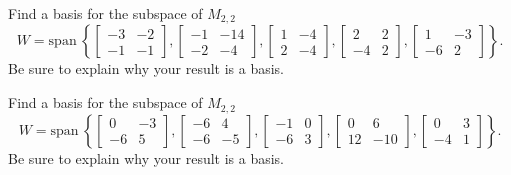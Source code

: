 \documentclass{article}
\begin{document}
\begin{exerciseStatement}
    Find a basis for the subspace of \(M_{2,2}\)
\[W=\mathrm{span}\ \left\{\left[\begin{array}{cc}
-3 & -2 \\
-1 & -1
\end{array}\right] , \left[\begin{array}{cc}
-1 & -14 \\
-2 & -4
\end{array}\right] , \left[\begin{array}{cc}
1 & -4 \\
2 & -4
\end{array}\right] , \left[\begin{array}{cc}
2 & 2 \\
-4 & 2
\end{array}\right] , \left[\begin{array}{cc}
1 & -3 \\
-6 & 2
\end{array}\right]\right\}.\]
 Be sure to explain why your result is a basis.


  
\end{exerciseStatement}

\begin{exerciseStatement}
    Find a basis for the subspace of \(M_{2,2}\)
\[W=\mathrm{span}\ \left\{\left[\begin{array}{cc}
0 & -3 \\
-6 & 5
\end{array}\right] , \left[\begin{array}{cc}
-6 & 4 \\
-6 & -5
\end{array}\right] , \left[\begin{array}{cc}
-1 & 0 \\
-6 & 3
\end{array}\right] , \left[\begin{array}{cc}
0 & 6 \\
12 & -10
\end{array}\right] , \left[\begin{array}{cc}
0 & 3 \\
-4 & 1
\end{array}\right]\right\}.\]
 Be sure to explain why your result is a basis.


  
\end{exerciseStatement}
\end{document}
